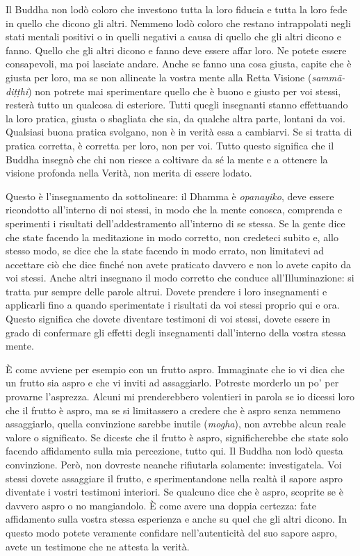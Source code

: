 Il Buddha non lodò coloro che investono tutta la loro fiducia e tutta la
loro fede in quello che dicono gli altri. Nemmeno lodò coloro che
restano intrappolati negli stati mentali positivi o in quelli negativi a
causa di quello che gli altri dicono e fanno. Quello che gli altri
dicono e fanno deve essere affar loro. Ne potete essere consapevoli, ma
poi lasciate andare. Anche se fanno una cosa giusta, capite che è giusta
per loro, ma se non allineate la vostra mente alla Retta Visione
(\emph{sammā-diṭṭhi}) non potrete mai sperimentare quello che è buono e
giusto per voi stessi, resterà tutto un qualcosa di esteriore. Tutti
quegli insegnanti stanno effettuando la loro pratica, giusta o sbagliata
che sia, da qualche altra parte, lontani da voi. Qualsiasi buona pratica
svolgano, non è in verità essa a cambiarvi. Se si tratta di pratica
corretta, è corretta per loro, non per voi. Tutto questo significa che
il Buddha insegnò che chi non riesce a coltivare da sé la mente e a
ottenere la visione profonda nella Verità, non merita di essere lodato.

Questo è l'insegnamento da sottolineare: il Dhamma è \emph{opanayiko},
deve essere ricondotto all'interno di noi stessi, in modo che la mente
conosca, comprenda e sperimenti i risultati dell'addestramento
all'interno di se stessa. Se la gente dice che state facendo la
meditazione in modo corretto, non credeteci subito e, allo stesso modo,
se dice che la state facendo in modo errato, non limitatevi ad accettare
ciò che dice finché non avete praticato davvero e non lo avete capito da
voi stessi. Anche altri insegnano il modo corretto che conduce
all'Illuminazione: si tratta pur sempre delle parole altrui. Dovete
prendere i loro insegnamenti e applicarli fino a quando sperimentate i
risultati da voi stessi proprio qui e ora. Questo significa che dovete
diventare testimoni di voi stessi, dovete essere in grado di confermare
gli effetti degli insegnamenti dall'interno della vostra stessa mente.

È come avviene per esempio con un frutto aspro. Immaginate che io vi
dica che un frutto sia aspro e che vi inviti ad assaggiarlo. Potreste
morderlo un po' per provarne l'asprezza. Alcuni mi prenderebbero
volentieri in parola se io dicessi loro che il frutto è aspro, ma se si
limitassero a credere che è aspro senza nemmeno assaggiarlo, quella
convinzione sarebbe inutile (\emph{mogha}), non avrebbe alcun reale
valore o significato. Se diceste che il frutto è aspro, significherebbe
che state solo facendo affidamento sulla mia percezione, tutto qui. Il
Buddha non lodò questa convinzione. Però, non dovreste neanche
rifiutarla solamente: investigatela. Voi stessi dovete assaggiare il
frutto, e sperimentandone nella realtà il sapore aspro diventate i
vostri testimoni interiori. Se qualcuno dice che è aspro, scoprite se è
davvero aspro o no mangiandolo. È come avere una doppia certezza: fate
affidamento sulla vostra stessa esperienza e anche su quel che gli altri
dicono. In questo modo potete veramente confidare nell'autenticità del
suo sapore aspro, avete un testimone che ne attesta la verità.

